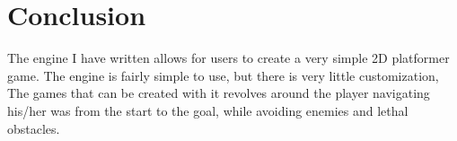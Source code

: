 \section{Conclusion}
\label{05}

The engine I have written allows for users to create a very simple 2D platformer game. The engine is fairly simple to use, but there is very little customization, The games that can be created with it revolves around the player navigating his/her was from the start to the goal, while avoiding enemies and lethal obstacles.